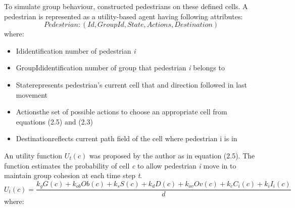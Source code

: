 \documentclass[a4paper,11pt,phdthesis,singlespace,twoside]{cssethesis}
\begin{document}
To simulate group behaviour, \cite{Bandini:2011} constructed pedestrians on these defined cells. A pedestrian is represented as a utility-based agent having following attributes:
\begin{equation}
Pedestrian: (Id,GroupId,State,Actions,Destination)
\end{equation}
where:
\begin{itemize}
  \item Id\textendash identification number of pedestrian \textit{i}
  \item GroupId\textendash identification number of group that pedestrian \textit{i} belongs to
  \item State\textendash represents pedestrian's current cell that and direction followed in last movement
	\item Actions\textendash the set of possible actions to choose an appropriate cell from equations (2.5) and (2.3)
	\item Destination\textendash reflects current path field of the cell where pedestrian i is in
\end{itemize}
An utility function \begin{math}U_{t}(c)\end{math}  was proposed by the author as in equation (2.5). The function estimates the probability of cell \textit{c} to allow pedestrian \textit{i} move in to maintain group cohesion at each time step \textit{t}.
\begin{equation}
U_{t}(c)= \frac{k_{g}G(c)+k_{ob}Ob(c)+k_{s}S(c)+k_{d}D(c)+k_{ov}Ov(c)+k_{c}C_{i}(c)+k_{i}I_{i}(c)}{d}
\end{equation}
where:
\end{document}
